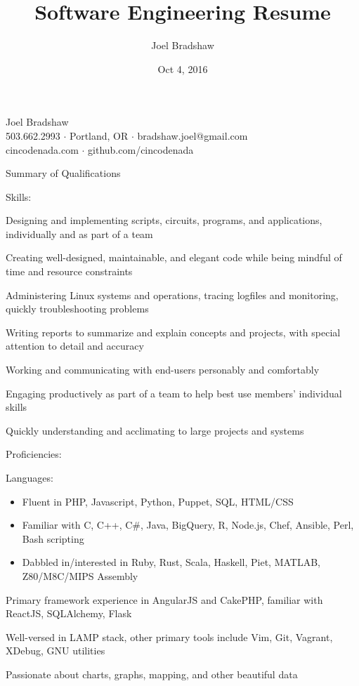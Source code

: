 \documentclass[letterpaper,10pt]{article}
\begin{document}
\title{Software Engineering Resume}
\author{Joel Bradshaw}
\date{Oct 4, 2016}
\begin{center}
{\Huge Joel Bradshaw}\\
\vskip 2pt
{\large 503.662.2993 \ensuremath{\cdot} Portland, OR \ensuremath{\cdot} bradshaw.joel@gmail.com\\
    cincodenada.com \ensuremath{\cdot} github.com/cincodenada}
\end{center}
\vskip -8pt

\begin{res_section}{Summary of Qualifications}
\begin{res_subsection}{Skills:}
  \item Designing and implementing scripts, circuits, programs, and applications, individually and as part of a team
  \item Creating well-designed, maintainable, and elegant code while being mindful of time and resource constraints
  \item Administering Linux systems and operations, tracing logfiles and monitoring, quickly troubleshooting problems
  \item Writing reports to summarize and explain concepts and projects, with special attention to detail and accuracy
  \item Working and communicating with end-users personably and comfortably
  \item Engaging productively as part of a team to help best use members' individual skills
  \item Quickly understanding and acclimating to large projects and systems
\end{res_subsection}
\begin{res_subsection}{Proficiencies:}
  \item Languages:
  \def \multicolsep {0pt}
  \setlength{\columnsep}{-8pt}
  \begin{itemize}
    \item Fluent in PHP, Javascript, Python, Puppet, SQL, HTML/CSS
    \item Familiar with C, C++, C\#, Java, BigQuery, R, Node.js, Chef, Ansible, Perl, Bash scripting
    \item Dabbled in/interested in Ruby, Rust, Scala, Haskell, Piet, MATLAB, Z80/M8C/MIPS Assembly
  \end{itemize}
  \item Primary framework experience in AngularJS and CakePHP, familiar with ReactJS, SQLAlchemy, Flask
  \item Well-versed in LAMP stack, other primary tools include Vim, Git, Vagrant, XDebug, GNU utilities
  \item Passionate about charts, graphs, mapping, and other beautiful data
\end{res_subsection}
\end{res_section}
\end{document}
